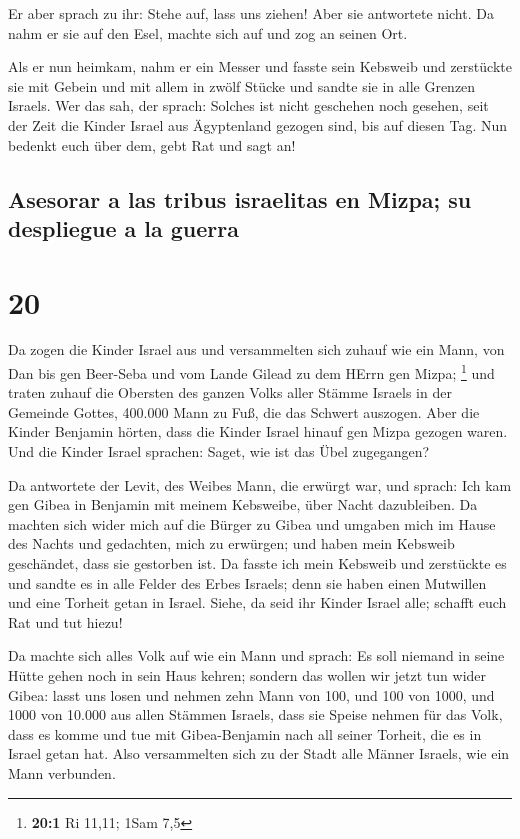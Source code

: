  Er aber sprach zu ihr: Stehe auf, lass uns ziehen! Aber
sie antwortete nicht. Da nahm er sie auf den Esel, machte sich auf und
zog an seinen Ort.

 Als er nun heimkam, nahm er ein Messer und fasste sein
Kebsweib und zerstückte sie mit Gebein und mit allem in zwölf Stücke und
sandte sie in alle Grenzen Israels.  Wer das sah, der
sprach: Solches ist nicht geschehen noch gesehen, seit der Zeit die
Kinder Israel aus Ägyptenland gezogen sind, bis auf diesen Tag. Nun
bedenkt euch über dem, gebt Rat und sagt an!

\hypertarget{asesorar-a-las-tribus-israelitas-en-mizpa-su-despliegue-a-la-guerra}{%
\subsection{Asesorar a las tribus israelitas en Mizpa; su despliegue a
la
guerra}\label{asesorar-a-las-tribus-israelitas-en-mizpa-su-despliegue-a-la-guerra}}

\hypertarget{section-19}{%
\section{20}\label{section-19}}

 Da zogen die Kinder Israel aus und versammelten sich
zuhauf wie ein Mann, von Dan bis gen Beer-Seba und vom Lande Gilead zu
dem HErrn gen Mizpa; \footnote{\textbf{20:1} Ri 11,11; 1Sam 7,5}
 und traten zuhauf die Obersten des ganzen Volks aller
Stämme Israels in der Gemeinde Gottes, 400.000 Mann zu Fuß, die das
Schwert auszogen.  Aber die Kinder Benjamin hörten, dass
die Kinder Israel hinauf gen Mizpa gezogen waren. Und die Kinder Israel
sprachen: Saget, wie ist das Übel zugegangen?

 Da antwortete der Levit, des Weibes Mann, die erwürgt
war, und sprach: Ich kam gen Gibea in Benjamin mit meinem Kebsweibe,
über Nacht dazubleiben.  Da machten sich wider mich auf
die Bürger zu Gibea und umgaben mich im Hause des Nachts und gedachten,
mich zu erwürgen; und haben mein Kebsweib geschändet, dass sie gestorben
ist.  Da fasste ich mein Kebsweib und zerstückte es und
sandte es in alle Felder des Erbes Israels; denn sie haben einen
Mutwillen und eine Torheit getan in Israel.  Siehe, da
seid ihr Kinder Israel alle; schafft euch Rat und tut hiezu!

 Da machte sich alles Volk auf wie ein Mann und sprach: Es
soll niemand in seine Hütte gehen noch in sein Haus kehren;
 sondern das wollen wir jetzt tun wider Gibea:
 lasst uns losen und nehmen zehn Mann von 100, und 100
von 1000, und 1000 von 10.000 aus allen Stämmen Israels, dass sie Speise
nehmen für das Volk, dass es komme und tue mit Gibea-Benjamin nach all
seiner Torheit, die es in Israel getan hat.  Also
versammelten sich zu der Stadt alle Männer Israels, wie ein Mann
verbunden.

